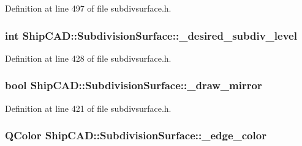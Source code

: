 Definition at line 497 of file subdivsurface.\+h.

\subsubsection[{\texorpdfstring{\+\_\+desired\+\_\+subdiv\+\_\+level}{_desired_subdiv_level}}]{\setlength{\rightskip}{0pt plus 5cm}int Ship\+C\+A\+D\+::\+Subdivision\+Surface\+::\+\_\+desired\+\_\+subdiv\+\_\+level\hspace{0.3cm}{\ttfamily [protected]}}\hypertarget{classShipCAD_1_1SubdivisionSurface_aeec20f09be87e6d57d88f903853ca96f}{}\label{classShipCAD_1_1SubdivisionSurface_aeec20f09be87e6d57d88f903853ca96f}


Definition at line 428 of file subdivsurface.\+h.

\subsubsection[{\texorpdfstring{\+\_\+draw\+\_\+mirror}{_draw_mirror}}]{\setlength{\rightskip}{0pt plus 5cm}bool Ship\+C\+A\+D\+::\+Subdivision\+Surface\+::\+\_\+draw\+\_\+mirror\hspace{0.3cm}{\ttfamily [protected]}}\hypertarget{classShipCAD_1_1SubdivisionSurface_a4ee73ae98bddfe1819419afd1d5ba029}{}\label{classShipCAD_1_1SubdivisionSurface_a4ee73ae98bddfe1819419afd1d5ba029}


Definition at line 421 of file subdivsurface.\+h.

\subsubsection[{\texorpdfstring{\+\_\+edge\+\_\+color}{_edge_color}}]{\setlength{\rightskip}{0pt plus 5cm}Q\+Color Ship\+C\+A\+D\+::\+Subdivision\+Surface\+::\+\_\+edge\+\_\+color\hspace{0.3cm}{\ttfamily [protected]}}\hypertarget{classShipCAD_1_1SubdivisionSurface_aced3b075062f92e55b3a89729cad3fd2}{}\label{classShipCAD_1_1SubdivisionSurface_aced3b075062f92e55b3a89729cad3fd2}


